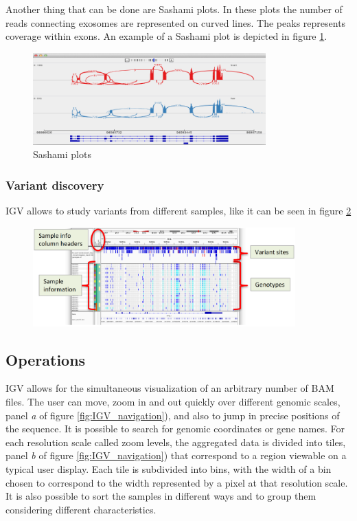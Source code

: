         Another thing that can be done are Sashami plots.
        In these plots the number of reads connecting exosomes are represented on curved lines.
        The peaks represents coverage within exons.
        An example of a Sashami plot is depicted in figure \ref{fig:sashami}.

        \begin{figure}[H]
            \centering
            \includegraphics[width=0.8\textwidth]{sashamiplot.PNG}
            \caption{Sashami plots}
            \label{fig:sashami}
        \end{figure}

        \subsubsection{Variant discovery}
        IGV allows to study variants from different samples, like it can be seen in figure \ref{fig:variants}

        \begin{figure}[H]
            \centering
            \includegraphics[width=0.9\textwidth]{variantsView.PNG}
            \label{fig:variants}
        \end{figure}

    \subsection{Operations}
    IGV allows for the simultaneous visualization of an arbitrary number of BAM files.
    The user can move, zoom in and out quickly over different genomic scales, panel \emph{a} of figure \ref{fig:IGV_navigation}), and also to jump in precise positions of the sequence.
    It is possible to search for genomic coordinates or gene names.
    For each resolution scale called zoom levels, the aggregated data is divided into tiles, panel \emph{b} of figure \ref{fig:IGV_navigation}) that correspond to a region viewable on a typical user display.
    Each tile is subdivided into bins, with the width of a bin chosen to correspond to the width represented by a pixel at that resolution scale.
    It is also possible to sort the samples in different ways and to group them considering different characteristics.


